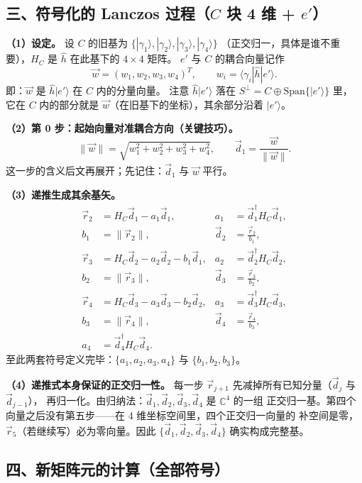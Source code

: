 \documentclass[11pt]{ctexart}
\begin{document}
\subsection{三、符号化的 Lanczos 过程（$C$ 块 4 维 + $e'$）}

\textbf{（1）设定。}
设 $C$ 的旧基为 $\{|\gamma_1\rangle,|\gamma_2\rangle,|\gamma_3\rangle,|\gamma_4\rangle\}$
（正交归一，具体是谁不重要），$H_C$ 是 $\hat h$ 在此基下的 $4\times4$ 矩阵。
$e'$ 与 $C$ 的耦合向量记作
\[
\vec w=(w_1,w_2,w_3,w_4)^{T},
\qquad
w_i=\langle\gamma_i|\hat h|e'\rangle .
\]
即：$\vec w$ 是 $\hat h|e'\rangle$ 在 $C$ 内的分量向量。
注意 $\hat h|e'\rangle$ 落在 $S^{\perp}=C\oplus\mathrm{Span}\{|e'\rangle\}$ 里，
它在 $C$ 内的部分就是 $\vec w$（在旧基下的坐标），其余部分沿着 $|e'\rangle$。

\textbf{（2）第 0 步：起始向量对准耦合方向（关键技巧）。}
\[
\|\vec w\|=\sqrt{w_1^2+w_2^2+w_3^2+w_4^2},
\qquad
\vec d_1=\frac{\vec w}{\|\vec w\|} .
\]
这一步的含义后文再展开；先记住：$\vec d_1$ 与 $\vec w$ 平行。

\textbf{（3）递推生成其余基矢。}
\begin{align*}
\vec r_2&=H_C\vec d_1-a_1\vec d_1,
& a_1&=\vec d_1^{\dagger}H_C\vec d_1,\\
b_1&=\|\vec r_2\|,
& \vec d_2&=\frac{\vec r_2}{b_1},\\
\vec r_3&=H_C\vec d_2-a_2\vec d_2-b_1\vec d_1,
& a_2&=\vec d_2^{\dagger}H_C\vec d_2,\\
b_2&=\|\vec r_3\|,
& \vec d_3&=\frac{\vec r_3}{b_2},\\
\vec r_4&=H_C\vec d_3-a_3\vec d_3-b_2\vec d_2,
& a_3&=\vec d_3^{\dagger}H_C\vec d_3,\\
b_3&=\|\vec r_4\|,
& \vec d_4&=\frac{\vec r_4}{b_3},\\
a_4&=\vec d_4^{\dagger}H_C\vec d_4 .
\end{align*}
至此两套符号定义完毕：$\{a_1,a_2,a_3,a_4\}$ 与 $\{b_1,b_2,b_3\}$。

\textbf{（4）递推式本身保证的正交归一性。}
每一步 $\vec r_{j+1}$ 先减掉所有已知分量（$\vec d_j$ 与 $\vec d_{j-1}$），
再归一化。由归纳法：$\vec d_1,\vec d_2,\vec d_3,\vec d_4$ 是 $\mathbb{C}^4$ 的一组
正交归一基。第四个向量之后没有第五步——在 4 维坐标空间里，四个正交归一向量的
补空间是零，$\vec r_5$（若继续写）必为零向量。因此 $\{\vec d_1,\vec d_2,\vec d_3,\vec d_4\}$
确实构成完整基。

\subsection{四、新矩阵元的计算（全部符号）}
\end{document}
